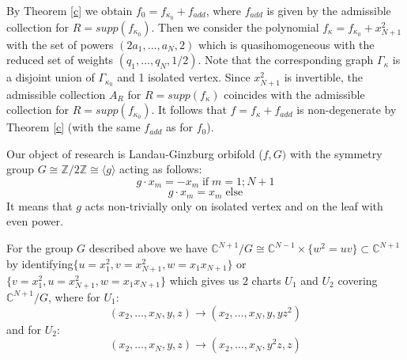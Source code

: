 \documentclass[reqno,12pt]{amsart}
\numberwithin{equation}{section}
\theoremstyle{plain}
\theoremstyle{definition}
\newcommand{\CC}{{\mathbb{C}}}
\newcommand{\ZZ}{{\mathbb{Z}}}
\begin{document}
By Theorem \ref{c} we obtain $f_0 = f_{\kappa_0} + f_{add}$, where $f_{add}$ is given by the admissible collection for $R = supp(f_{\kappa_0})$. Then we consider the polynomial $f_\kappa = f_{\kappa_0} + x_{N+1}^2$ with the set of powers $(2a_1, \dots, a_N, 2)$ which is quasihomogeneous with the reduced set of weights $(q_1,\dots,q_N, 1/2)$. Note that the corresponding graph $\Gamma_\kappa$ is a disjoint union of $\Gamma_{\kappa_0}$ and 1 isolated vertex. Since $x_{N+1}^2$ is invertible, the admissible collection $A_R$ for $R = supp(f_\kappa)$ coincides with the admissible collection for $R = supp(f_{\kappa_0})$. It follows that $f = f_\kappa + f_{add}$ is non-degenerate by Theorem \ref{c} (with the same $f_{add}$ as for $f_0$).

Our object of research is Landau-Ginzburg orbifold ($f, G)$ with the symmetry group $G\cong \ZZ/2\ZZ \cong \langle g\rangle$ acting as follows:
\[g\cdot x_m = - x_m \;\text{if}\; m = 1;N+1\] 
\[g\cdot x_{m} =  x_{m} \; \text{else} \]
It means that $g$ acts non-trivially only on isolated vertex and on the leaf with even power.

For the group $G$ described above we have $\CC^{N+1}/G \cong \CC^{N-1} \times \{w^2 = uv\}\subset \CC^{N+1}$ by identifying$\{u = x_1^2, v = x_{N+1}^2, w = x_1x_{N+1}\}$ or $\{v = x_1^2, u = x_{N+1}^2, w = x_1x_{N+1}\}$ which gives us $2$ charts $U_1$ and $U_2$ covering $\CC^{N+1}/G$, where for $U_1$:
\[(x_{2}, \dots, x_{N}, y, z) \longrightarrow (x_{2}, \dots, x_{N}, y,  yz^2)\]
and for $U_2$:
\[(x_{2}, \dots, x_{N}, y, z) \longrightarrow (x_{2}, \dots, x_{N}, y^2z, z)\]
\end{document}
